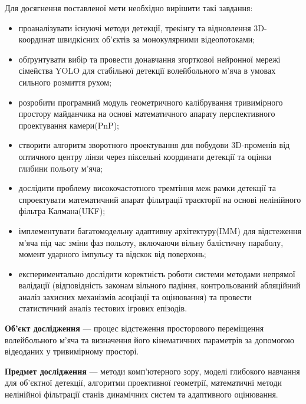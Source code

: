 \begin{unnumbered}
Для досягнення поставленої мети необхідно вирішити такі завдання:
\begin{itemize}
    \item проаналізувати існуючі методи детекції, трекінгу та відновлення
    3D-координат швидкісних об'єктів за монокулярними
    відеопотоками;
    \item обґрунтувати вибір та провести донавчання згорткової нейронної
    мережі сімейства \gls{YOLO} для стабільної детекції волейбольного
    м'яча в умовах сильного розмиття рухом;
    \item розробити програмний модуль геометричного калібрування
    тривимірного простору майданчика на основі математичного
    апарату перспективного проектування камери(\gls{PnP});
    \item створити алгоритм зворотного проектування для
    побудови 3D-променів від оптичного центру лінзи через піксельні
    координати детекції та оцінки глибини польоту м'яча;
    \item дослідити проблему високочастотного тремтіння меж рамки
    детекції та спроектувати математичний апарат
    фільтрації траєкторії на основі нелінійного фільтра Калмана(\gls{UKF});
    \item імплементувати багатомодельну адаптивну архітектуру(\gls{IMM}) для відстеження м'яча під час зміни фаз
    польоту, включаючи вільну балістичну параболу, момент ударного
    імпульсу та відскок від поверхонь;
    \item експериментально дослідити коректність роботи системи методами
    непрямої валідації (відповідність законам вільного падіння, контрольований
    абляційний аналіз захисних механізмів асоціації та оцінювання) та
    провести статистичний аналіз тестових ігрових епізодів.
\end{itemize}

\textbf{Об'єкт дослідження} — процес відстеження просторового переміщення
волейбольного м'яча та визначення його кінематичних параметрів за допомогою
відеоданих у тривимірному просторі.

\textbf{Предмет дослідження} — методи комп'ютерного зору, моделі глибокого
навчання для об'єктної детекції, алгоритми проективної геометрії, математичні
методи нелінійної фільтрації станів динамічних систем та адаптивного
оцінювання.



\end{unnumbered}
